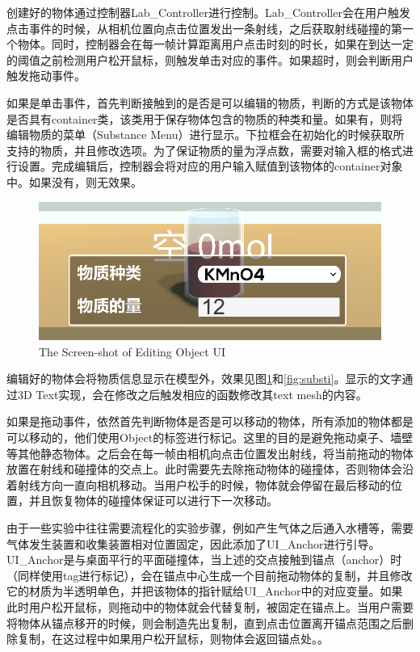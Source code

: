 	创建好的物体通过控制器Lab\_Controller进行控制。Lab\_Controller会在用户触发点击事件的时候，从相机位置向点击位置发出一条射线，之后获取射线碰撞的第一个物体。同时，控制器会在每一帧计算距离用户点击时刻的时长，如果在到达一定的阈值之前检测用户松开鼠标，则触发单击对应的事件。如果超时，则会判断用户触发拖动事件。

	如果是单击事件，首先判断接触到的是否是可以编辑的物质，判断的方式是该物体是否具有container类，该类用于保存物体包含的物质的种类和量。如果有，则将编辑物质的菜单（Substance Menu）进行显示。下拉框会在初始化的时候获取所支持的物质，并且修改选项。为了保证物质的量为浮点数，需要对输入框的格式进行设置。完成编辑后，控制器会将对应的用户输入赋值到该物体的container对象中。如果没有，则无效果。
	
\begin{figure}[!htp]
  \centering
  \includegraphics[width=12cm]{figure/subs.png}
    {The Screen-shot of Editing Object UI}
 \label{fig:subs}
\end{figure}

编辑好的物体会将物质信息显示在模型外，效果见图\ref{fig:subs}和\ref{fig:substi}。显示的文字通过3D Text实现，会在修改之后触发相应的函数修改其text mesh的内容。

如果是拖动事件，依然首先判断物体是否是可以移动的物体，所有添加的物体都是可以移动的，他们使用Object的标签进行标记。这里的目的是避免拖动桌子、墙壁等其他静态物体。之后会在每一帧由相机向点击位置发出射线，将当前拖动的物体放置在射线和碰撞体的交点上。此时需要先去除拖动物体的碰撞体，否则物体会沿着射线方向一直向相机移动。当用户松手的时候，物体就会停留在最后移动的位置，并且恢复物体的碰撞体保证可以进行下一次移动。

由于一些实验中往往需要流程化的实验步骤，例如产生气体之后通入水槽等，需要气体发生装置和收集装置相对位置固定，因此添加了UI\_Anchor进行引导。UI\_Anchor是与桌面平行的平面碰撞体，当上述的交点接触到锚点（anchor）时（同样使用tag进行标记），会在锚点中心生成一个目前拖动物体的复制，并且修改它的材质为半透明单色，并把该物体的指针赋给UI\_Anchor中的对应变量。如果此时用户松开鼠标，则拖动中的物体就会代替复制，被固定在锚点上。当用户需要将物体从锚点移开的时候，则会制造先出复制，直到点击位置离开锚点范围之后删除复制，在这过程中如果用户松开鼠标，则物体会返回锚点处。。
	
